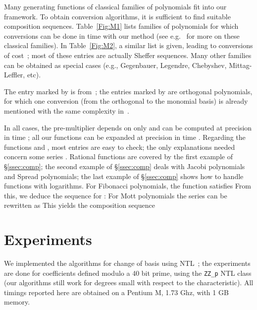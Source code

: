 \documentclass{sig-alternate}
\begin{document}
Many generating functions of classical families of polynomials fit
into our framework. To obtain conversion algorithms, it is sufficient
to find suitable composition sequences. Table~\ref{Fig:M1} lists
families of polynomials for which conversions can be done in time
 with our method (see e.g.~\cite{Roman05,AnAsRo99} for more
on these classical families). In Table~\ref{Fig:M2}, a similar list is
given, leading to conversions of cost~; most of these
entries are actually Sheffer sequences. Many other families can be
obtained as special cases (e.g., Gegenbauer, Legendre, Chebyshev,
Mittag-Leffler, etc). 

The entry marked by  is from~\cite{Gerhard00}; the entries
marked by  are orthogonal polynomials, for which one
conversion (from the orthogonal to the monomial basis) is already
mentioned with the same complexity in~\cite{DrHeRo97,PoStTa98}.

In all cases, the pre-multiplier  depends on  only and
can be computed at precision  in time ; all our functions
 can be expanded at precision  in time . Regarding the
functions  and , most entries are easy to check; the only
explanations needed concern some series . Rational functions are
covered by the first example of \S\ref{ssec:comp}; the second example
of \S\ref{ssec:comp} deals with Jacobi polynomials and Spread
polynomials; the last example of \S\ref{ssec:comp} shows how to handle
functions with logarithms.  For Fibonacci polynomials, the function
 satisfies   From this, we deduce the sequence
for :
 For
 Mott polynomials the series  can be
 rewritten as
 This yields the composition
sequence








\section{Experiments}

We implemented the algorithms for change of basis using
NTL~\cite{Shoup95}; the experiments are done for coefficients defined
modulo a 40 bit prime, using the \verb+ZZ_p+ NTL class (our algorithms
still work for degrees small with respect to the characteristic). All
timings reported here are obtained on a Pentium M, 1.73 Ghz, with 1 GB
memory.
\end{document}
